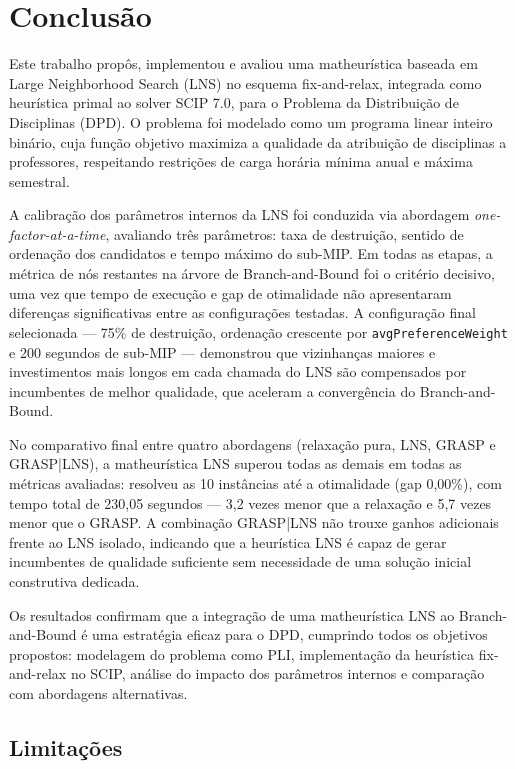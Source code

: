 \chapter{Conclusão}

Este trabalho propôs, implementou e avaliou uma matheurística baseada em Large Neighborhood Search (LNS) no esquema fix-and-relax, integrada como heurística primal ao solver SCIP 7.0, para o Problema da Distribuição de Disciplinas (DPD). O problema foi modelado como um programa linear inteiro binário, cuja função objetivo maximiza a qualidade da atribuição de disciplinas a professores, respeitando restrições de carga horária mínima anual e máxima semestral.

A calibração dos parâmetros internos da LNS foi conduzida via abordagem \emph{one-factor-at-a-time}, avaliando três parâmetros: taxa de destruição, sentido de ordenação dos candidatos e tempo máximo do sub-MIP. Em todas as etapas, a métrica de nós restantes na árvore de Branch-and-Bound foi o critério decisivo, uma vez que tempo de execução e gap de otimalidade não apresentaram diferenças significativas entre as configurações testadas. A configuração final selecionada --- 75\% de destruição, ordenação crescente por \texttt{avgPreferenceWeight} e 200 segundos de sub-MIP --- demonstrou que vizinhanças maiores e investimentos mais longos em cada chamada do LNS são compensados por incumbentes de melhor qualidade, que aceleram a convergência do Branch-and-Bound.

No comparativo final entre quatro abordagens (relaxação pura, LNS, GRASP e GRASP|LNS), a matheurística LNS superou todas as demais em todas as métricas avaliadas: resolveu as 10 instâncias até a otimalidade (gap 0,00\%), com tempo total de 230,05 segundos --- 3,2 vezes menor que a relaxação e 5,7 vezes menor que o GRASP. A combinação GRASP|LNS não trouxe ganhos adicionais frente ao LNS isolado, indicando que a heurística LNS é capaz de gerar incumbentes de qualidade suficiente sem necessidade de uma solução inicial construtiva dedicada.

Os resultados confirmam que a integração de uma matheurística LNS ao Branch-and-Bound é uma estratégia eficaz para o DPD, cumprindo todos os objetivos propostos: modelagem do problema como PLI, implementação da heurística fix-and-relax no SCIP, análise do impacto dos parâmetros internos e comparação com abordagens alternativas.

\section{Limitações}

